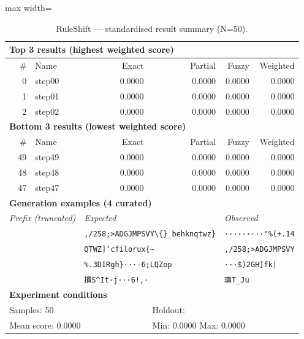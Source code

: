\begin{table}[htbp]
\centering
\caption{RuleShift — standardised result summary (N=50).}
\label{tab:ruleshift_summary}
\begin{adjustbox}{max width=\textwidth}
\begin{tabular}{r p{5cm} r r r r}
\toprule
\multicolumn{6}{l}{\textbf{Top 3 results (highest weighted score)}} \\
\midrule
\# & Name & Exact & Partial & Fuzzy & Weighted \\
\midrule
0 & step00 & 0.0000 & 0.0000 & 0.0000 & 0.0000 \\
1 & step01 & 0.0000 & 0.0000 & 0.0000 & 0.0000 \\
2 & step02 & 0.0000 & 0.0000 & 0.0000 & 0.0000 \\
\midrule
\multicolumn{6}{l}{\textbf{Bottom 3 results (lowest weighted score)}} \\
\midrule
\# & Name & Exact & Partial & Fuzzy & Weighted \\
\midrule
49 & step49 & 0.0000 & 0.0000 & 0.0000 & 0.0000 \\
48 & step48 & 0.0000 & 0.0000 & 0.0000 & 0.0000 \\
47 & step47 & 0.0000 & 0.0000 & 0.0000 & 0.0000 \\
\midrule
\multicolumn{6}{l}{\textbf{Generation examples (4 curated)}} \\
\midrule
\multicolumn{2}{l}{\textit{Prefix (truncated)}} & \multicolumn{2}{l}{\textit{Expected}} & \multicolumn{2}{l}{\textit{Observed}} \\
\midrule
\multicolumn{2}{l}{\texttt{}} & \multicolumn{2}{l}{\texttt{,/258;>ADGJMPSVY\textbackslash\{\}\_behknqtwz\}}} & \multicolumn{2}{l}{\texttt{·········"\%(+.14}} \\
\multicolumn{2}{l}{\texttt{}} & \multicolumn{2}{l}{\texttt{QTWZ]`cfilorux\{\textasciitilde{}}} & \multicolumn{2}{l}{\texttt{,/258;>ADGJMPSVY}} \\
\multicolumn{2}{l}{\texttt{}} & \multicolumn{2}{l}{\texttt{\%.3DIRgh\}···-6;LQZop}} & \multicolumn{2}{l}{\texttt{···\$)2GH]fk|}} \\
\multicolumn{2}{l}{\texttt{}} & \multicolumn{2}{l}{\texttt{摜S\^{}It·j···6!,·}} & \multicolumn{2}{l}{\texttt{璝T\_Ju}} \\
\midrule
\multicolumn{6}{l}{\textbf{Experiment conditions}} \\
\midrule
\multicolumn{3}{l}{Samples: 50} & \multicolumn{3}{l}{Holdout: } \\
\multicolumn{3}{l}{Mean score: 0.0000} & \multicolumn{3}{l}{Min: 0.0000 \quad Max: 0.0000} \\

\end{tabular}
\end{adjustbox}
\end{table}
